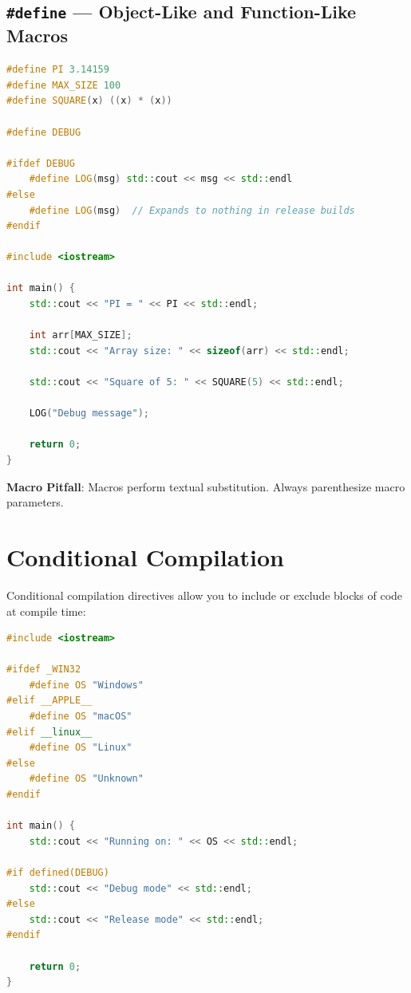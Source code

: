 \subsection{\texttt{\#define} --- Object-Like and Function-Like Macros}

\begin{lstlisting}[language=C++, caption={Basic preprocessor macros}]
#define PI 3.14159
#define MAX_SIZE 100
#define SQUARE(x) ((x) * (x))

#define DEBUG

#ifdef DEBUG
    #define LOG(msg) std::cout << msg << std::endl
#else
    #define LOG(msg)  // Expands to nothing in release builds
#endif

#include <iostream>

int main() {
    std::cout << "PI = " << PI << std::endl;

    int arr[MAX_SIZE];
    std::cout << "Array size: " << sizeof(arr) << std::endl;

    std::cout << "Square of 5: " << SQUARE(5) << std::endl;

    LOG("Debug message");

    return 0;
}
\end{lstlisting}

\textbf{Macro Pitfall}: Macros perform textual substitution. Always parenthesize macro parameters.

\section{Conditional Compilation}
\label{sec:conditional-compilation}

Conditional compilation directives allow you to include or exclude blocks of code at compile time:

\begin{lstlisting}[language=C++, caption={Platform-specific conditional compilation}]
#include <iostream>

#ifdef _WIN32
    #define OS "Windows"
#elif __APPLE__
    #define OS "macOS"
#elif __linux__
    #define OS "Linux"
#else
    #define OS "Unknown"
#endif

int main() {
    std::cout << "Running on: " << OS << std::endl;

#if defined(DEBUG)
    std::cout << "Debug mode" << std::endl;
#else
    std::cout << "Release mode" << std::endl;
#endif

    return 0;
}
\end{lstlisting}

